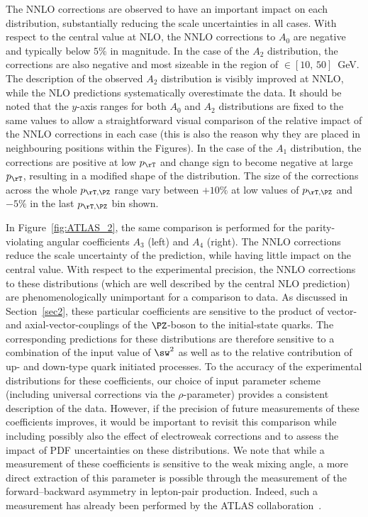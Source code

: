 The NNLO corrections are observed to have an important impact on each distribution, substantially reducing the scale uncertainties in all cases. With respect to the central value at NLO, the NNLO corrections to $A_0$ are negative and typically below $5\%$ in magnitude. In the case of the $A_2$ distribution, the corrections are also negative and most sizeable in the region of \ptz $\in[10,\,50]$~GeV. The description of the observed $A_2$ distribution is visibly improved at NNLO, while the NLO predictions systematically overestimate the data.
%
It should be noted that the $y$-axis ranges for both $A_0$ and $A_2$ distributions are fixed to the same values to
allow a straightforward visual comparison of the relative impact of the NNLO corrections in each case
(this is also the reason why they are placed in neighbouring positions within the Figures).
In the case of the $A_1$ distribution, the corrections are positive at low $p_\rT$ and 
change sign to become negative at large $p_\rT$, resulting in a modified shape of the distribution.
The size of the corrections across the whole $\ptz$ range vary between $+10\%$ at low values of $\ptz$ and $-5\%$ 
in the last $\ptz$ bin shown.

In Figure~\ref{fig:ATLAS_2}, the same comparison is performed for the 
parity-violating angular coefficients $A_3$ (left) and $A_4$ (right).
%
The NNLO corrections reduce the scale uncertainty of the prediction,
while having little impact on the central value. With respect to the experimental precision, the NNLO corrections to these distributions (which are well described by the central NLO prediction) are phenomenologically unimportant for a comparison to data.
%
As discussed in Section~\ref{sec2}, these particular coefficients are sensitive to the product of vector- and axial-vector-couplings 
of the $\PZ$-boson to the initial-state quarks. The corresponding predictions for these distributions are 
therefore sensitive to a combination of the input value of $\sw^2$ as well as to the relative 
contribution of up- and down-type quark initiated processes.
%
To the accuracy of the experimental distributions for these coefficients, our
choice of input parameter scheme (including universal corrections via the $\rho$-parameter) 
provides a consistent description of the data. However, if the precision of future measurements of these 
coefficients improves, it would be important to revisit this comparison while including possibly 
also the effect of electroweak corrections and to assess the impact of PDF uncertainties on these distributions.
%
We note that while a measurement of these coefficients is sensitive to the weak mixing angle, 
a more direct extraction of this parameter is possible through the measurement
of the forward--backward asymmetry in lepton-pair production. Indeed, such a measurement 
has already been performed by the ATLAS collaboration~\cite{Aad:2015uau}.

